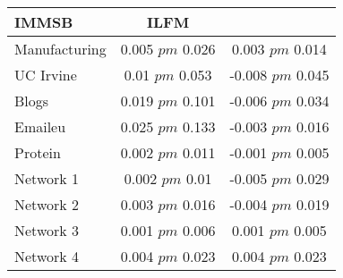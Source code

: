 \begin{tabular}{@{}lcc@{}}
\toprule

\textbf{IMMSB} & \textbf{ILFM} \\\midrule

Manufacturing & 0.005 \(pm\) 0.026 & 0.003 \(pm\) 0.014 \\
UC Irvine & 0.01 \(pm\) 0.053 & -0.008 \(pm\) 0.045 \\
Blogs & 0.019 \(pm\) 0.101 & -0.006 \(pm\) 0.034 \\
Emaileu & 0.025 \(pm\) 0.133 & -0.003 \(pm\) 0.016 \\
Protein & 0.002 \(pm\) 0.011 & -0.001 \(pm\) 0.005 \\
Network 1 & 0.002 \(pm\) 0.01 & -0.005 \(pm\) 0.029 \\
Network 2 & 0.003 \(pm\) 0.016 & -0.004 \(pm\) 0.019 \\
Network 3 & 0.001 \(pm\) 0.006 & 0.001 \(pm\) 0.005 \\
Network 4 & 0.004 \(pm\) 0.023 & 0.004 \(pm\) 0.023 \\

\bottomrule
\end{tabular}
